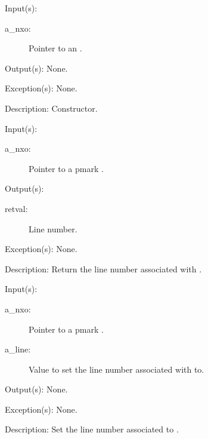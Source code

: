 \begin{capi}
\label{nxo_pmark_new}
	\begin{capilist}
	\item[Input(s): ]
		\begin{description}\item[]
		\item[a\_nxo: ]
			Pointer to an .
		\end{description}
	\item[Output(s): ] None.
	\item[Exception(s): ] None.
	\item[Description: ]
		Constructor.
	\end{capilist}
\label{nxo_pmark_line_get}
	\begin{capilist}
	\item[Input(s): ]
		\begin{description}\item[]
		\item[a\_nxo: ]
			Pointer to a pmark \classname{nxo}.
		\end{description}
	\item[Output(s): ]
		\begin{description}\item[]
		\item[retval: ]
			Line number.
		\end{description}
	\item[Exception(s): ] None.
	\item[Description: ]
		Return the line number associated with \cvar{a\_nxo}.
	\end{capilist}
\label{nxo_pmark_line_set}
	\begin{capilist}
	\item[Input(s): ]
		\begin{description}\item[]
		\item[a\_nxo: ]
			Pointer to a pmark .
		\item[a\_line: ]
			Value to set the line number associated with
			 to.
		\end{description}
	\item[Output(s): ] None.
	\item[Exception(s): ] None.
	\item[Description: ]
		Set the line number associated  to \cvar{a\_val}.
	\end{capilist}
\end{capi}
